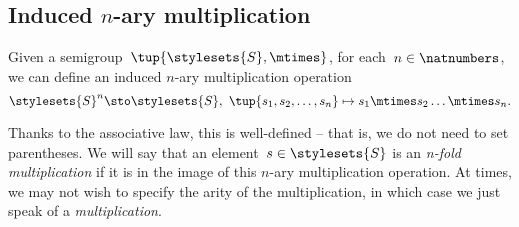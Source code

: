\subsection{Induced $n$-ary multiplication}
Given a semigroup~$\tup{\stylesets{S}, \mtimes}$, for each~$n \in \natnumbers$, we can define an induced $n$-ary multiplication operation
\begin{equation*}
    \stylesets{S}^n \sto \stylesets{S}, \ \tup{s_1, s_2, \dots, s_n} \mapsto s_1 \mtimes s_2 \dots \mtimes s_n.
\end{equation*}



Thanks to the associative law, this is well-defined -- that is, we do not need to set parentheses.
We will say that an element~$s \in \stylesets{S}$ is an \emph{n-fold multiplication} if it is in the image of this $n$-ary multiplication operation.
At times, we may not wish to specify the arity of the multiplication, in which case we just speak of a \emph{multiplication}.

\showslides{\begin{forslides}
                \begin{equation}
                    \label{eq:sg-mora}
                    \mora
                \end{equation}
                \begin{equation}
                    \label{eq:sg-morb}
                    \morb
                \end{equation}
                \begin{equation}
                    \label{eq:sg-morab}
                    \mora\then\morb
                \end{equation}

\end{forslides}
}
